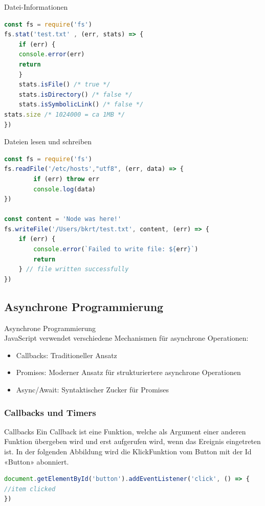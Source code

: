 \begin{code}{Datei-Informationen}
\begin{lstlisting}[language=JavaScript, style=basesmol]
const fs = require('fs')
fs.stat('test.txt' , (err, stats) => {
    if (err) {
    console.error(err)
    return
    }
    stats.isFile() /* true */
    stats.isDirectory() /* false */
    stats.isSymbolicLink() /* false */
stats.size /* 1024000 = ca 1MB */
})
\end{lstlisting}
\end{code}

\begin{examplecode}{Dateien lesen und schreiben}
\begin{lstlisting}[language=JavaScript, style=basesmol]
const fs = require('fs')
fs.readFile('/etc/hosts',"utf8", (err, data) => {
        if (err) throw err
        console.log(data)
})

const content = 'Node was here!'
fs.writeFile('/Users/bkrt/test.txt', content, (err) => {
    if (err) {
        console.error(`Failed to write file: ${err}`)
        return
    } // file written successfully
})
\end{lstlisting}
\end{examplecode}

\subsection{Asynchrone Programmierung}

\begin{concept}{Asynchrone Programmierung}\\
    JavaScript verwendet verschiedene Mechanismen für asynchrone Operationen:
    \begin{itemize}
        \item Callbacks: Traditioneller Ansatz
        \item Promises: Moderner Ansatz für strukturiertere asynchrone Operationen
        \item Async/Await: Syntaktischer Zucker für Promises
    \end{itemize}
\end{concept}

\subsubsection{Callbacks und Timers}

\begin{definition}{Callbacks}
Ein Callback ist eine Funktion, welche als Argument einer anderen Funktion übergeben wird und erst aufgerufen wird, wenn das Ereignis eingetreten ist. 
In der folgenden Abbildung wird die KlickFunktion vom Button mit der Id «Button» abonniert.
\begin{lstlisting}[language=JavaScript, style=basesmol]
document.getElementById('button').addEventListener('click', () => {
//item clicked
})
\end{lstlisting}
\end{definition}

